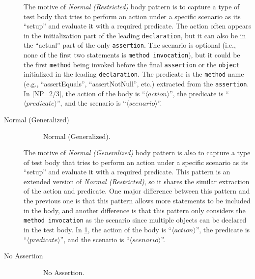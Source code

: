 \documentclass[proposal.tex]{subfiles}
\begin{document}
\begin{description}
The motive of \textit{Normal (Restricted)} body pattern is to capture a type of test body that tries to perform an action under a specific scenario as its \enquote{setup} and evaluate it with a required predicate.
%
The action often appears in the initialization part of the leading \texttt{declaration}, but it can also be in the \enquote{actual} part of the only \texttt{assertion}.
%
The scenario is optional (i.e., none of the first two statements is \texttt{method invocation}), but it could be the first \texttt{method} being invoked before the final \texttt{assertion} or the \texttt{object} initialized in the leading \texttt{declaration}.
%
The predicate is the \texttt{method} name (e.g., \enquote{assertEquals}, \enquote{assertNotNull}, etc.) extracted from the \texttt{assertion}.
%
In \cref{NP_2/3}, the action of the body is \enquote{$\langle action \rangle$}, the predicate is \enquote{$\langle predicate \rangle$}, and the scenario is \enquote{$\langle scenario \rangle$}.


\item[Normal (Generalized)] 

\begin{figure}[t]
\centering
    \begin{subfigure}{0.675\textwidth}
    \end{subfigure}
\caption{Normal (Generalized).}
\label{NP_any}
\end{figure}

The motive of \textit{Normal (Generalized)} body pattern is also to capture a type of test body that tries to perform an action under a specific scenario as its \enquote{setup} and evaluate it with a required predicate.
%
This pattern is an extended version of \textit{Normal (Restricted)}, so it shares the similar extraction of the action and predicate.
%
One major difference between this pattern and the previous one is that this pattern allows more statements to be included in the body, and another difference is that this pattern only considers the \texttt{method invocation} as the scenario since multiple objects can be declared in the test body.
%
In \cref{NP_any}, the action of the body is \enquote{$\langle action \rangle$}, the predicate is \enquote{$\langle predicate \rangle$}, and the scenario is \enquote{$\langle scenario \rangle$}.


\item[No Assertion] 

\begin{figure}[t]
\centering
    \begin{subfigure}{0.7\textwidth}
    \end{subfigure}
\caption{No Assertion.}
\label{NoAstP}
\end{figure}


\end{description}
\end{document}
